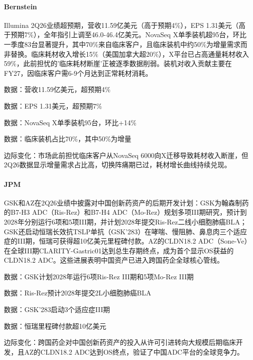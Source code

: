 \documentclass[11pt]{ctexart}
\begin{document}
\paragraph{Bernstein} Illumina 2Q26业绩超预期，营收11.59亿美元（高于预期4\%），EPS 1.31美元（高于预期7\%），全年指引上调至46.0-46.4亿美元。NovaSeq X单季装机超95台，环比一季度83台显著提升，其中70\%来自临床客户，且临床装机中约50\%为增量需求而非替换。临床耗材收入增长15\%（美国加拿大超20\%），X平台已占高通量耗材收入59\%，此前担忧的'临床耗材断崖'正被逐季数据削弱。装机对收入贡献主要在FY27，因临床客户需6-9个月达到正常耗材消耗。
{\small\color{refgray}数据：营收11.59亿美元，超预期4\%\par}
{\small\color{refgray}数据：EPS 1.31美元，超预期7\%\par}
{\small\color{refgray}数据：NovaSeq X单季装机95台，环比+14\%\par}
{\small\color{refgray}数据：临床装机占比70\%，其中50\%为增量\par}
{\small\color{refgray}边际变化：市场此前担忧临床客户从NovaSeq 6000向X迁移导致耗材收入断崖，但2Q26数据显示增量需求占比高，切换阵痛期已过，耗材增长曲线持续兑现。\par}
\paragraph{JPM} GSK和AZ在2Q26业绩中披露对中国创新药资产的后期开发计划：GSK为翰森制药的B7-H3 ADC（Ris-Rez）和B7-H4 ADC（Mo-Rez）规划多项III期研究，预计到2028年分别运行6项和5项III期，并计划2028年提交Ris-Rez二线小细胞肺癌BLA；GSK还启动恒瑞长效抗TSLP单抗（GSK'283）在哮喘、慢阻肺、鼻息肉三个适应症的III期，恒瑞可获得超10亿美元里程碑付款。AZ的CLDN18.2 ADC（Sone-Ve）在全球III期CLARITY-Gastric01达到总生存期终点，成为首个显示OS获益的CLDN18.2 ADC。这些进展表明中国资产已进入跨国药企全球核心管线。
{\small\color{refgray}数据：GSK计划2028年运行6项Ris-Rez III期和5项Mo-Rez III期\par}
{\small\color{refgray}数据：Ris-Rez预计2028年提交2L小细胞肺癌BLA\par}
{\small\color{refgray}数据：GSK'283启动3个适应症III期\par}
{\small\color{refgray}数据：恒瑞里程碑付款超10亿美元\par}
{\small\color{refgray}边际变化：跨国药企对中国创新药资产的投入从许可引进转向大规模后期临床开发，且AZ的CLDN18.2 ADC达到OS终点，验证了中国ADC平台的全球竞争力。\par}
\end{document}
